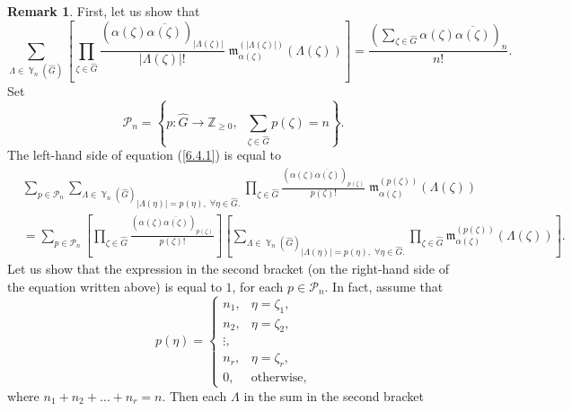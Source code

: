 \documentclass[12pt]{amsart}
\theoremstyle{definition}
\newtheorem{rem}[thm]{Remark}
\numberwithin{equation}{section}
\DeclareMathOperator{\Y}{\mathbb{Y}}
\begin{document}
\begin{rem}
First, let us show that
\begin{equation}\label{6.4.1}
\sum\limits_{\Lambda\in\Y_n(\widehat{G})}\left[\prod\limits_{\zeta\in\widehat{G}}
\frac{\left(\alpha(\zeta)\overline{\alpha(\zeta)}\right)_{|\Lambda(\zeta)|}}{|\Lambda(\zeta)|!}\;\mathfrak{m}_{\alpha(\zeta)}^{\left(|\Lambda(\zeta)|\right)}
\left(\Lambda(\zeta)\right)\right]=\frac{\left(\sum\limits_{\zeta\in\widehat{G}}
\alpha(\zeta)\overline{\alpha(\zeta)}\right)_n}{n!}.
\end{equation}
Set
\begin{equation}
\mathcal{P}_n=\left\{p: \widehat{G}\longrightarrow\mathbb{Z}_{\geq 0},\;\; \sum\limits_{\zeta\in\widehat{G}}p(\zeta)=n\right\}.
\end{equation}
The left-hand side of equation (\ref{6.4.1}) is equal to
\begin{equation}
\begin{split}
&\sum\limits_{p\in\mathcal{P}_n}
\underset{|\Lambda(\eta)|=p(\eta),\; \forall\eta\in\widehat{G}.}{\sum\limits_{\Lambda\in\Y_n\left(\widehat{G}\right)}}
\prod\limits_{\zeta\in\widehat{G}}
\frac{\left(\alpha(\zeta)
\overline{\alpha(\zeta)}\right)_{p(\zeta)}}{p(\zeta)!}\;
\mathfrak{m}_{\alpha(\zeta)}^{(p(\zeta))}
\left(\Lambda(\zeta)\right)\\
&=\sum\limits_{p\in\mathcal{P}_n}
\left[\prod\limits_{\zeta\in\widehat{G}}
\frac{\left(\alpha(\zeta)
\overline{\alpha(\zeta)}\right)_{p(\zeta)}}{p(\zeta)!}\right]
\left[\underset{|\Lambda(\eta)|=p(\eta),\; \forall\eta\in\widehat{G}.}{\sum\limits_{\Lambda\in\Y_n\left(\widehat{G}\right)}}
\prod\limits_{\zeta\in\widehat{G}}\mathfrak{m}_{\alpha(\zeta)}^{(p(\zeta))}
\left(\Lambda(\zeta)\right)\right].
\end{split}
\end{equation}
Let us show that the expression in the second bracket (on the right-hand side of the equation written above) is equal to $1$, for each $p\in\mathcal{P}_n$.
In fact, assume that
\begin{equation}
p(\eta)=\left\{
  \begin{array}{ll}
    n_1, & \eta=\zeta_1,\\
    n_2, & \eta=\zeta_2, \\
    \vdots, &  \\
    n_r, & \eta=\zeta_r,\\
    0, & \mbox{otherwise},
  \end{array}
\right.
\end{equation}
where $n_1+n_2+\ldots+n_r=n$. Then each $\Lambda$ in the sum in the second bracket

\end{rem}
\end{document}
